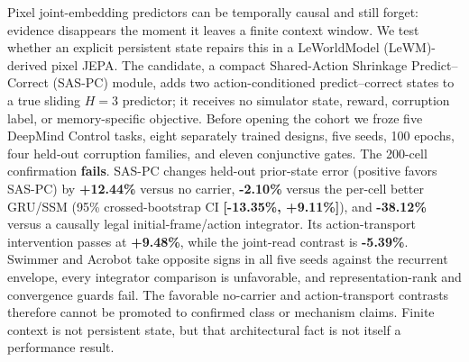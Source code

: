 Pixel joint-embedding predictors can be temporally causal and still
forget: evidence disappears the moment it leaves a finite context
window. We test whether an explicit persistent state repairs this in a
LeWorldModel (LeWM)-derived pixel JEPA. The candidate, a compact
Shared-Action Shrinkage Predict--Correct (SAS-PC) module, adds two
action-conditioned predict--correct states to a true sliding
\(H=3\) predictor; it receives no simulator state, reward,
corruption label, or memory-specific objective. Before opening the
cohort we froze five DeepMind Control tasks, eight separately trained
designs, five seeds, 100 epochs, four held-out corruption families, and
eleven conjunctive gates. The 200-cell confirmation \textbf{fails}.
SAS-PC changes held-out prior-state error (positive favors SAS-PC) by
\textbf{+12.44\%} versus no carrier, \textbf{-2.10\%} versus the
per-cell better GRU/SSM (95\% crossed-bootstrap CI \textbf{{[}-13.35\%,
+9.11\%{]}}), and \textbf{-38.12\%} versus a causally legal
initial-frame/action integrator. Its action-transport intervention
passes at \textbf{+9.48\%}, while the joint-read contrast is
\textbf{-5.39\%}. Swimmer and Acrobot take opposite signs in all five
seeds against the recurrent envelope, every integrator comparison is
unfavorable, and representation-rank and convergence guards fail. The
favorable no-carrier and action-transport contrasts therefore cannot be
promoted to confirmed class or mechanism claims. Finite context is not
persistent state, but that architectural fact is not itself a
performance result.
